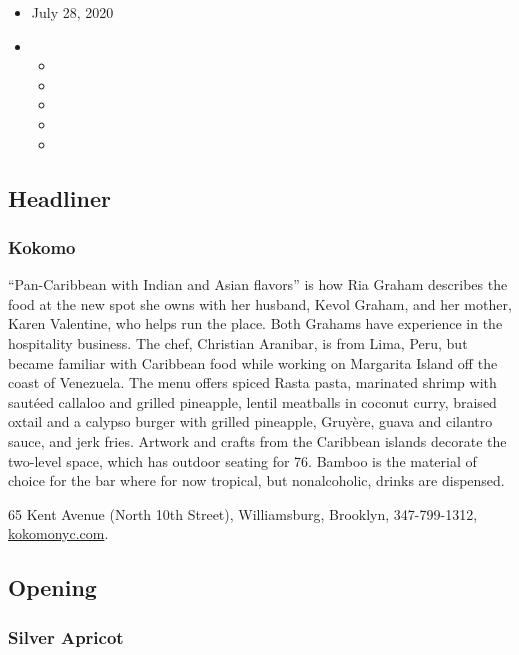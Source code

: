 \begin{itemize}
\item
  July 28, 2020
\item
  \begin{itemize}
  \item
  \item
  \item
  \item
  \item
  \end{itemize}
\end{itemize}

\hypertarget{headliner}{%
\subsection{Headliner}\label{headliner}}

\hypertarget{kokomo}{%
\subsubsection{Kokomo}\label{kokomo}}

``Pan-Caribbean with Indian and Asian flavors'' is how Ria Graham
describes the food at the new spot she owns with her husband, Kevol
Graham, and her mother, Karen Valentine, who helps run the place. Both
Grahams have experience in the hospitality business. The chef, Christian
Aranibar, is from Lima, Peru, but became familiar with Caribbean food
while working on Margarita Island off the coast of Venezuela. The menu
offers spiced Rasta pasta, marinated shrimp with sautéed callaloo and
grilled pineapple, lentil meatballs in coconut curry, braised oxtail and
a calypso burger with grilled pineapple, Gruyère, guava and cilantro
sauce, and jerk fries. Artwork and crafts from the Caribbean islands
decorate the two-level space, which has outdoor seating for 76. Bamboo
is the material of choice for the bar where for now tropical, but
nonalcoholic, drinks are dispensed.

65 Kent Avenue (North 10th Street), Williamsburg, Brooklyn,
347-799-1312, \href{https://www.kokomonyc.com/}{kokomonyc.com}.

\hypertarget{opening}{%
\subsection{Opening}\label{opening}}

\hypertarget{silver-apricot-}{%
\subsubsection{Silver Apricot }\label{silver-apricot-}}

